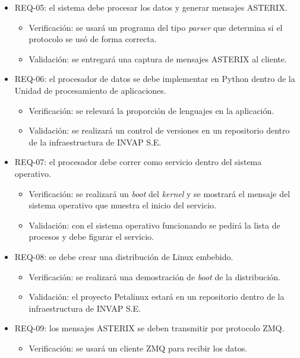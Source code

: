 \documentclass[
11pt, %
]{charter}
\begin{document}
\begin{itemize}
\begin{itemize}
			\item REQ-05: el sistema debe procesar los datos y generar mensajes
        ASTERIX.
        \begin{itemize}
          \item Verificación: se usará un programa del tipo \emph{parser} que
            determina si el protocolo se usó de forma correcta.
          \item Validación: se entregará una captura de mensajes ASTERIX al
            cliente.
        \end{itemize}
      \item REQ-06: el procesador de datos se debe implementar en Python dentro de la
        Unidad de procesamiento de aplicaciones.
        \begin{itemize}
          \item Verificación: se relevará la proporción de lenguajes en la
            aplicación.
          \item Validación: se realizará un control de versiones en un
            repositorio dentro de la infraestructura de INVAP S.E.
        \end{itemize}
      \item REQ-07: el procesador debe correr como servicio dentro del sistema
        operativo.
        \begin{itemize}
          \item Verificación: se realizará un \emph{boot} del \emph{kernel} y se
            mostrará el mensaje del sistema operativo que muestra el inicio del
            servicio.
          \item Validación: con el sistema operativo funcionando se pedirá la
            lista de procesos y debe figurar el servicio.
        \end{itemize}
      \item REQ-08: se debe crear una distribución de Linux embebido.
        \begin{itemize}
          \item Verificación: se realizará una demostración de \emph{boot} de la
            distribución.
          \item Validación: el proyecto Petalinux estará en un repositorio
            dentro de la infraestructura de INVAP S.E.
        \end{itemize}
			\item REQ-09: los mensajes ASTERIX se deben transmitir por protocolo ZMQ.
        \begin{itemize}
          \item Verificación: se usará un cliente ZMQ para recibir los datos.

\end{itemize}
\end{itemize}
\end{itemize}
\end{document}
